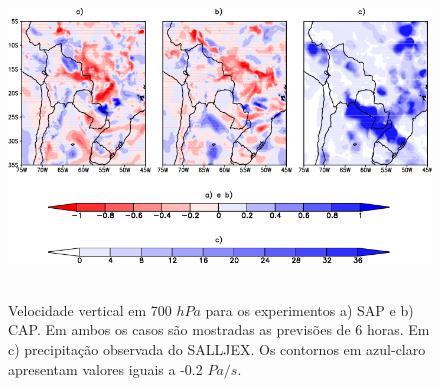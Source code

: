 \begin{figure}[!h]
\centering
\includegraphics[height=8.5cm]{./figs/vel_vert_omega_salljex.png}
\caption{Velocidade vertical em 700 $hPa$ para os experimentos a) SAP e b) CAP. Em ambos os casos são mostradas as previsões de 6 horas. Em c) precipitação observada do SALLJEX. Os contornos em azul-claro apresentam valores iguais a -0.2 $Pa/s$.}
\label{fig67}
\end{figure}
